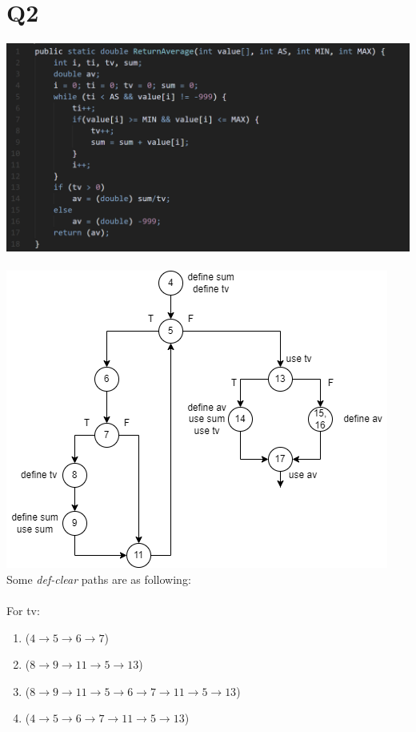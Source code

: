 \documentclass[12pt, letterpaper, titlepage]{article}
\begin{document}
\section*{Q2}
\includegraphics[scale=0.89]{code.png} \\\\
\includegraphics[scale=0.6]{Image3.png} \\
Some \textit{def-clear} paths are as following:\\\\
For tv:
\begin{enumerate}
    \item ($4 \rightarrow  5 \rightarrow 6 \rightarrow 7$)
    \item ($8 \rightarrow 9 \rightarrow 11 \rightarrow 5 \rightarrow 13$)
    \item ($8 \rightarrow 9 \rightarrow 11 \rightarrow 5 \rightarrow 6 \rightarrow 7 \rightarrow 11 \rightarrow 5 \rightarrow 13$)
    \item ($4 \rightarrow  5 \rightarrow 6 \rightarrow 7 \rightarrow 11 \rightarrow 5 \rightarrow 13$)
\end{enumerate}
\end{document}
